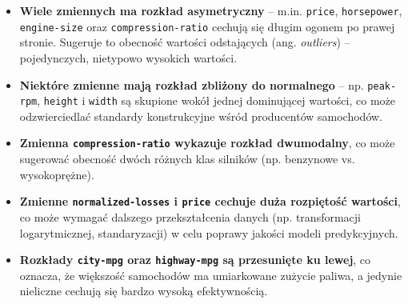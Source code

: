 \documentclass[12pt,a4paper]{article}
\begin{document}
\begin{itemize}
    \item \textbf{Wiele zmiennych ma rozkład asymetryczny} – m.in. \texttt{price}, \texttt{horsepower}, \texttt{engine-size} oraz \texttt{compression-ratio} cechują się długim ogonem po prawej stronie. Sugeruje to obecność wartości odstających (ang. \textit{outliers}) – pojedynczych, nietypowo wysokich wartości.

    \item \textbf{Niektóre zmienne mają rozkład zbliżony do normalnego} – np. \texttt{peak-rpm}, \texttt{height} i \texttt{width} są skupione wokół jednej dominującej wartości, co może odzwierciedlać standardy konstrukcyjne wśród producentów samochodów.

    \item \textbf{Zmienna \texttt{compression-ratio} wykazuje rozkład dwumodalny}, co może sugerować obecność dwóch różnych klas silników (np. benzynowe vs. wysokoprężne).

    \item \textbf{Zmienne \texttt{normalized-losses} i \texttt{price} cechuje duża rozpiętość wartości}, co może wymagać dalszego przekształcenia danych (np. transformacji logarytmicznej, standaryzacji) w celu poprawy jakości modeli predykcyjnych.

    \item \textbf{Rozkłady \texttt{city-mpg} oraz \texttt{highway-mpg} są przesunięte ku lewej}, co oznacza, że większość samochodów ma umiarkowane zużycie paliwa, a jedynie nieliczne cechują się bardzo wysoką efektywnością.
\end{itemize}
\end{document}
